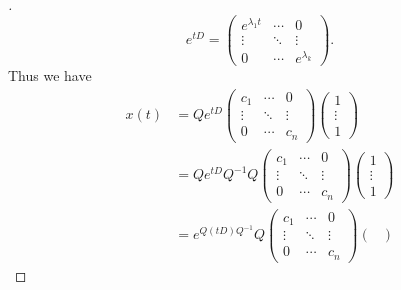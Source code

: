 \begin{proof}[]
  \[
    e^{tD} = \begin{pmatrix}
      e^{\lambda_1 t} & \cdots & 0             \\
      \vdots          & \ddots & \vdots        \\
      0               & \cdots & e^{\lambda_k}
    \end{pmatrix}.
  \]
  Thus we have
  \begin{align*}
    x(t) & = Q e^{tD} \begin{pmatrix}
                        c_1    & \cdots & 0      \\
                        \vdots & \ddots & \vdots \\
                        0      & \cdots & c_n
                      \end{pmatrix} \begin{pmatrix}
                                      1      \\
                                      \vdots \\
                                      1
                                    \end{pmatrix}                                             \\
         & = Q e^{tD} Q^{-1} Q \begin{pmatrix}
                                 c_1    & \cdots & 0      \\
                                 \vdots & \ddots & \vdots \\
                                 0      & \cdots & c_n
                               \end{pmatrix} \begin{pmatrix}
                                               1      \\
                                               \vdots \\
                                               1
                                             \end{pmatrix}                                    \\
         & = e^{Q (tD) Q^{-1}} Q \begin{pmatrix}
                                   c_1    & \cdots & 0      \\
                                   \vdots & \ddots & \vdots \\
                                   0      & \cdots & c_n
                                 \end{pmatrix} \begin{pmatrix}

\end{pmatrix}
\end{align*}
\end{proof}
